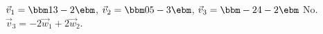 {$\vec{v}_1 = \bbm 1\\3\\-2\ebm$, $\vec{v}_2 = \bbm 0\\5\\-3\ebm$, $\vec{v}_3 = \bbm -2\\4\\-2\ebm$}
{No. $\vec{v}_3 = -2\vec{w}_1+2\vec{w}_2$.}